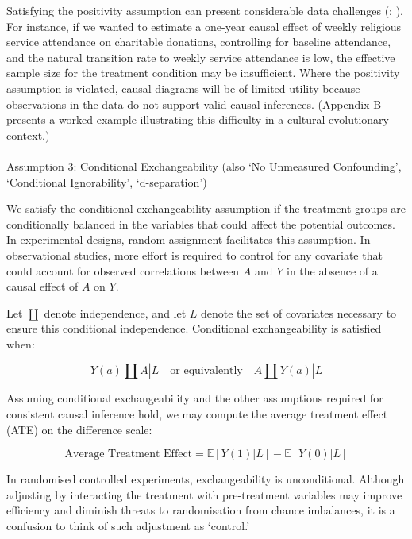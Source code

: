 \documentclass[
  single column]{article}
\makeatletter
\let\oldparagraph\paragraph
\renewcommand{\paragraph}{
    \@ifstar
      \xxxParagraphStar
      \xxxParagraphNoStar
  }
\newcommand{\xxxParagraphStar}[1]{\oldparagraph*{#1}\mbox{}}
\newcommand{\xxxParagraphNoStar}[1]{\oldparagraph{#1}\mbox{}}
\makeatother
\begin{document}
Satisfying the positivity assumption can present considerable data
challenges (;
). For instance, if
we wanted to estimate a one-year causal effect of weekly religious
service attendance on charitable donations, controlling for baseline
attendance, and the natural transition rate to weekly service attendance
is low, the effective sample size for the treatment condition may be
insufficient. Where the positivity assumption is violated, causal
diagrams will be of limited utility because observations in the data do
not support valid causal inferences. (\hyperref[id-app-b]{Appendix B}
presents a worked example illustrating this difficulty in a cultural
evolutionary context.)

\paragraph{Assumption 3: Conditional Exchangeability (also `No
Unmeasured Confounding', `Conditional Ignorability',
`d-separation')}\label{assumption-3-conditional-exchangeability-also-no-unmeasured-confounding-conditional-ignorability-d-separation}

We satisfy the conditional exchangeability assumption if the treatment
groups are conditionally balanced in the variables that could affect the
potential outcomes. In experimental designs, random assignment
facilitates this assumption. In observational studies, more effort is
required to control for any covariate that could account for observed
correlations between \(A\) and \(Y\) in the absence of a causal effect
of \(A\) on \(Y\).

Let \(\coprod\) denote independence, and let \(L\) denote the set of
covariates necessary to ensure this conditional independence.
Conditional exchangeability is satisfied when:

\[
Y(a) \coprod A | L \quad \text{or equivalently} \quad A \coprod Y(a) | L
\]

Assuming conditional exchangeability and the other assumptions required
for consistent causal inference hold, we may compute the average
treatment effect (ATE) on the difference scale:

\[
\text{Average Treatment Effect} = \mathbb{E}[Y(1) | L] - \mathbb{E}[Y(0) | L]
\]

In randomised controlled experiments, exchangeability is unconditional.
Although adjusting by interacting the treatment with pre-treatment
variables may improve efficiency and diminish threats to randomisation
from chance imbalances, it is a confusion to think of such adjustment as
`control.'
\end{document}
